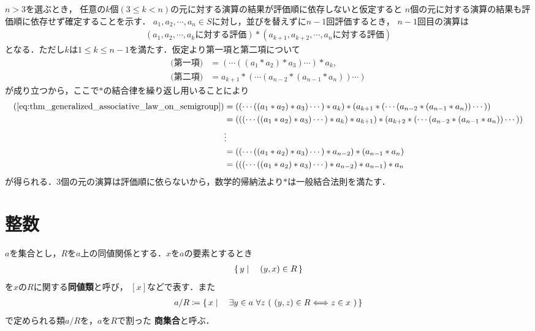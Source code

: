 	\begin{prf}
		$n > 3$を選ぶとき，
		任意の$k$個$(3 \leq k < n)$の元に対する演算の結果が評価順に依存しないと仮定すると
		$n$個の元に対する演算の結果も評価順に依存せず確定することを示す．
		$a_1,a_2,\cdots,a_n \in S$に対し，並びを替えずに$n-1$回評価するとき，
		$n-1$回目の演算は
		\begin{align}
			(\mbox{$a_1,a_2,\cdots,a_k$に対する評価}) \ast
			(\mbox{$a_{k+1},a_{k+2},\cdots,a_n$に対する評価})
			\label{eq:thm_generalized_associative_law_on_semigroup}
		\end{align}
		となる．ただし$k$は$1 \leq k \leq n-1$を満たす．仮定より第一項と第二項について
		\begin{align}
			\mbox{(第一項)} &= (\cdots((a_1 \ast a_2) \ast a_3)\cdots) \ast a_k, \\
			\mbox{(第二項)} &= a_{k+1} \ast (\cdots(a_{n-2} \ast (a_{n-1} \ast a_n))\cdots)
		\end{align}
		が成り立つから，ここで$\ast$の結合律を繰り返し用いることにより
		\begin{align}
			(\refeq{eq:thm_generalized_associative_law_on_semigroup}) 
			&= ((\cdots((a_1 \ast a_2) \ast a_3)\cdots) \ast a_k) \ast (a_{k+1} \ast (\cdots(a_{n-2} \ast (a_{n-1} \ast a_n))\cdots)) \\
			&= (((\cdots((a_1 \ast a_2) \ast a_3)\cdots) \ast a_k) \ast a_{k+1}) \ast (a_{k+2} \ast (\cdots(a_{n-2} \ast (a_{n-1} \ast a_n))\cdots)) \\
			&\vdots \\
			&= ((\cdots((a_1 \ast a_2) \ast a_3)\cdots) \ast a_{n-2}) \ast (a_{n-1} \ast a_n) \\
			&= (((\cdots((a_1 \ast a_2) \ast a_3)\cdots) \ast a_{n-2}) \ast a_{n-1}) \ast a_n
		\end{align}
		が得られる．$3$個の元の演算は評価順に依らないから，数学的帰納法より$\ast$は一般結合法則を満たす．
		\QED
	\end{prf}

\section{整数}
	\begin{screen}
		\begin{dfn}[商集合]
			$a$を集合とし，$R$を$a$上の同値関係とする．$x$を$a$の要素とするとき
			\begin{align}
				\left\{\, y \mid \quad (y,x) \in R\, \right\}
			\end{align}
			を$x$の$R$に関する{\bf 同値類}と呼び，
			$[x]$などで表す．また
			\begin{align}
				a / R \coloneqq \Set{x}{\exists y \in a\ \forall z\ (\ (y,z) \in R \Longleftrightarrow z \in x\ )}
			\end{align}
			で定められる類$a/R$を，$a$を$R$で割った
			{\bf 商集合}と呼ぶ．
		\end{dfn}
	\end{screen}
	
